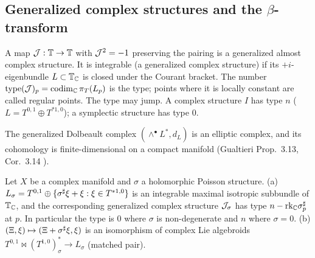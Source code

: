 \subsection{Generalized complex structures and the $\beta$-transform}
\begin{defn}\tC\label{defn:GC}
A map $\mathcal J:\mathbb T\to\mathbb T$ with $\mathcal J^2=-1$ preserving the pairing is a generalized almost complex structure. It is integrable (a generalized complex structure) if its $+i$-eigenbundle $L\subset\mathbb T_\mathbb C$ is closed under the Courant bracket. The number $\mathrm{type}(\mathcal J)_p=\mathrm{codim}_\mathbb C\,\pi_T(L_p)$ is the type; points where it is locally constant are called regular points. The type may jump. A complex structure $I$ has type $n$ ($L=T^{0,1}\oplus T^{*1,0}$); a symplectic structure has type $0$.
\end{defn}
The generalized Dolbeault complex $(\wedge^\bullet L^*,d_L)$ is an elliptic complex, and its cohomology is finite-dimensional on a compact manifold (Gualtieri \cite{Gua11} Prop.~3.13, Cor.~3.14 \tC).

\begin{prop}\tC\label{prop:Jsigma}
Let $X$ be a complex manifold and $\sigma$ a holomorphic Poisson structure. (a) $L_\sigma=T^{0,1}\oplus\{\sigma^\sharp\xi+\xi:\xi\in T^{*1,0}\}$ is an integrable maximal isotropic subbundle of $\mathbb T_\mathbb C$, and the corresponding generalized complex structure $\mathcal J_\sigma$ has type $n-\mathrm{rk}_\mathbb C\sigma^\sharp_p$ at $p$. In particular the type is $0$ where $\sigma$ is non-degenerate and $n$ where $\sigma=0$. (b) $(\Xi,\xi)\mapsto(\Xi+\sigma^\sharp\xi,\xi)$ is an isomorphism of complex Lie algebroids $T^{0,1}\bowtie(T^{1,0})^*_\sigma\to L_\sigma$ (matched pair).
\end{prop}

